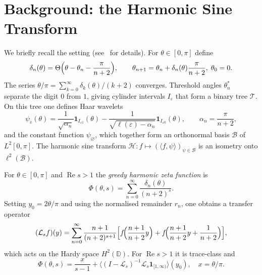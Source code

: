 \documentclass[11pt,a4paper]{article}
\theoremstyle{remark}
\newcommand{\cL}{\mathcal{L}}
\begin{document}
\section{Background: the Harmonic Sine Transform}

We briefly recall the setting (see~\cite{greedy-harmonic} for details). For $\theta\in[0,\pi]$ define
\[
\delta_n(\theta)=\Theta\Bigl(\theta-\theta_n-\frac{\pi}{n+2}\Bigr),\qquad
\theta_{n+1}=\theta_n+\delta_n(\theta)\frac{\pi}{n+2},\;\theta_0=0.
\]
The series $\theta/\pi=\sum_{k=0}^\infty \delta_k(\theta)/(k+2)$ converges. Threshold angles $\theta_n^*$ separate the digit $0$ from $1$, giving cylinder intervals $I_\varepsilon$ that form a binary tree $\mathcal{T}$. On this tree one defines Haar wavelets
\[
\psi_\varepsilon(\theta)=\frac{1}{\sqrt{\alpha_n}}\mathbf{1}_{I_{\varepsilon1}}(\theta)-\frac{1}{\sqrt{\ell(\varepsilon)-\alpha_n}}\mathbf{1}_{I_{\varepsilon0}}(\theta),
\qquad\alpha_n=\frac{\pi}{n+2},
\]
and the constant function $\psi_\varnothing$, which together form an orthonormal basis $\mathcal{B}$ of $L^2[0,\pi]$. The harmonic sine transform $\mathcal{H}:f\mapsto(\langle f,\psi\rangle)_{\psi\in\mathcal{B}}$ is an isometry onto $\ell^2(\mathcal{B})$.

For $\theta\in[0,\pi]$ and $\operatorname{Re}s>1$ the \emph{greedy harmonic zeta function} is
\[
\Phi(\theta,s)=\sum_{n=0}^{\infty}\frac{\delta_n(\theta)}{(n+2)^s}.
\]
Setting $y_0=2\theta/\pi$ and using the normalised remainder $r_n$, one obtains a transfer operator
\begin{equation}\label{eq:Ls}
(\cL_s f)(y)=\sum_{n=0}^{\infty}\frac{n+1}{(n+2)^{s+1}}
\Bigl[ f\!\Bigl(\frac{n+1}{n+2}y\Bigr)+
        f\!\Bigl(\frac{n+1}{n+2}y+\frac{1}{n+2}\Bigr) \Bigr],
\end{equation}
which acts on the Hardy space $H^2(\mathbb{D})$. For $\operatorname{Re}s>1$ it is trace‑class and
\[
\Phi(\theta,s)=\frac{x}{s-1}+\big\langle (I-\cL_s)^{-1}\cL_s\mathbf{1}_{[1,\infty)}\big\rangle(y_0),\quad x=\theta/\pi.
\]
\end{document}

